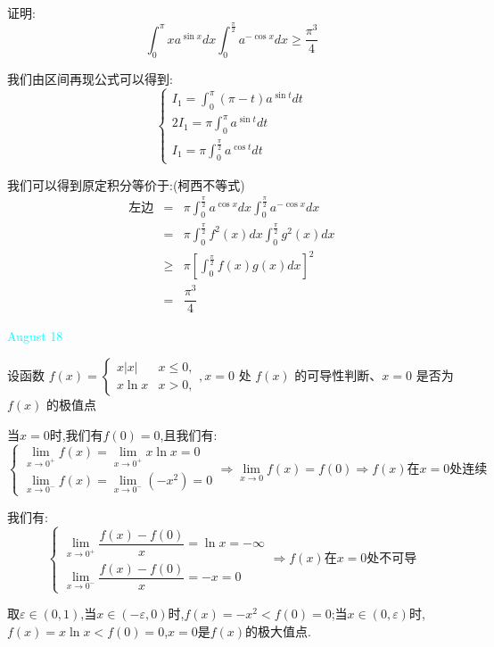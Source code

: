 \begin{example}[][Exam: 34.3.6]
	证明: 
	$$\int_{0}^{\pi}xa^{\sin x}dx\int_{0}^{\frac{\pi}{2}}a^{-\cos x}dx\geq \dfrac{\pi^3}{4}$$
\end{example}

\begin{solution}

	我们由区间再现公式可以得到:
	$$\left\lbrace 
	\begin{array}{l}
		I_{1}=\int_{0}^{\pi}(\pi-t)a^{\sin t}dt\\
		2I_{1}=\pi\int_{0}^{\pi}a^{\sin t}dt\\
		I_{1}=\pi\int_{0}^{\frac{\pi}{2}}a^{\cos t}dt
	\end{array}
	\right. $$
	
	我们可以得到原定积分等价于:(柯西不等式)
	\begin{eqnarray*}
		\text{左边}&=&\pi\int_{0}^{\frac{\pi}{2}}a^{\cos x}dx\int_{0}^{\frac{\pi}{2}}a^{-\cos x}dx\\
		&=&\pi\int_{0}^{\frac{\pi}{2}}f^{2}(x)dx\int_{0}^{\frac{\pi}{2}}g^{2}(x)dx\\
		&\geq &\pi \left[ \int_{0}^{\frac{\pi}{2}}f(x)g(x)dx\right]^2\\
		&=&\dfrac{\pi^3}{4} 
	\end{eqnarray*}
\end{solution}


\textcolor{cyan}{August 18}

\begin{example}[][Exam: 34.3.7]
	设函数 $f(x)=\begin{cases}
		x|x| & x\leq 0,\\
		x\ln x & x>0,
	\end{cases}, x=0$ 处 $f(x)$ 的可导性判断、$x=0$ 是否为 $f(x)$ 的极值点
\end{example}
\begin{solution}

	当$x=0$时,我们有$f(0)=0$,且我们有:  
	$$\left\lbrace
	\begin{array}{l}
		\lim\limits_{x\to 0^{+}}f(x)=\lim\limits_{x\to 0^{+}}x\ln x=0\\
		\lim\limits_{x\to 0^{-}}f(x)=\lim\limits_{x\to 0^{-}}(-x^2)=0
	\end{array}
	\right. \Rightarrow \lim\limits_{x\to 0}f(x)=f(0)\Rightarrow f(x)\text{在}x=0\text{处连续}$$
	
	我们有:  
	$$\left\lbrace
	\begin{array}{l}
		\lim\limits_{x\to 0^{+}}\dfrac{f(x)-f(0)}{x}=\ln x=-\infty\\
		\lim\limits_{x\to 0^{-}}\dfrac{f(x)-f(0)}{x}=-x=0
	\end{array}
	\right. \Rightarrow f(x)\text{在}x=0\text{处不可导}$$
	
	取$\varepsilon\in(0,1)$,当$x\in(-\varepsilon,0)$时,$f(x)=-x^2<f(0)=0$;当$x\in(0,\varepsilon)$时,$f(x)=x\ln x<f(0)=0$,$x=0$是$f(x)$的极大值点.
\end{solution}

